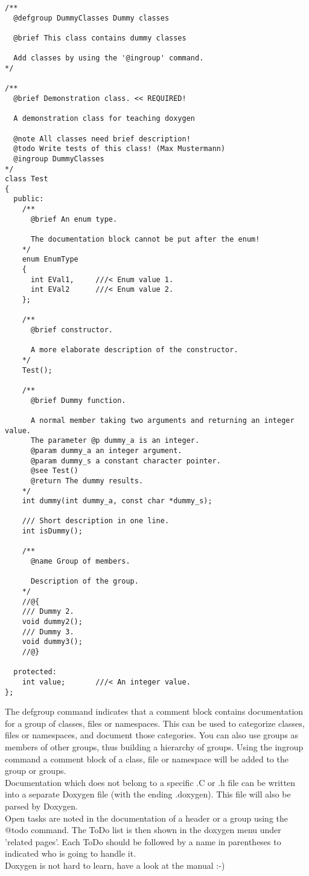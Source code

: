 \documentclass[a4]{article}
\begin{document}
\begin{verbatim}
/**
  @defgroup DummyClasses Dummy classes

  @brief This class contains dummy classes

  Add classes by using the '@ingroup' command.
*/

/**
  @brief Demonstration class. << REQUIRED!

  A demonstration class for teaching doxygen

  @note All classes need brief description!
  @todo Write tests of this class! (Max Mustermann)
  @ingroup DummyClasses
*/
class Test
{
  public:
    /**
      @brief An enum type.

      The documentation block cannot be put after the enum!
    */
    enum EnumType
    {
      int EVal1,     ///< Enum value 1.
      int EVal2      ///< Enum value 2.
    };

    /**
      @brief constructor.

      A more elaborate description of the constructor.
    */
    Test();

    /**
      @brief Dummy function.

      A normal member taking two arguments and returning an integer value.
      The parameter @p dummy_a is an integer.
      @param dummy_a an integer argument.
      @param dummy_s a constant character pointer.
      @see Test()
      @return The dummy results.
    */
    int dummy(int dummy_a, const char *dummy_s);

    /// Short description in one line.
    int isDummy();

    /**
      @name Group of members.

      Description of the group.
    */
    //@{
    /// Dummy 2.
    void dummy2();
    /// Dummy 3.
    void dummy3();
    //@}

  protected:
    int value;       ///< An integer value.
};
\end{verbatim}
The defgroup command indicates that a comment block contains documentation for a group of classes, files or namespaces.
This can be used to categorize classes, files or namespaces, and document those categories.
You can also use groups as members of other groups, thus building a hierarchy of groups.
Using the ingroup command a comment block of a class, file or namespace will be added to the group or groups.\\
Documentation which does not belong to a specific .C or .h file can be written into a
separate Doxygen file (with the ending .doxygen). This file will also be parsed by Doxygen.\\
Open tasks are noted in the documentation of a header or a group using the @todo command.
The ToDo list is then shown in the doxygen menu under 'related pages'. Each ToDo should be
followed by a name in parentheses to indicated who is going to handle it.\\
Doxygen is not hard to learn, have a look at the manual :-)
\end{document}
